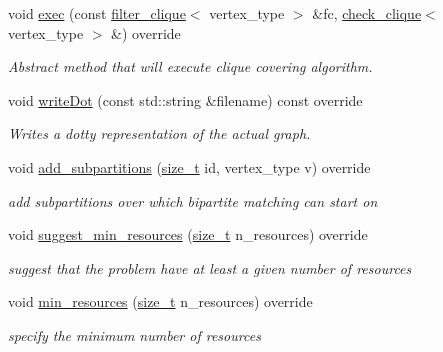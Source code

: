 \begin{DoxyCompactItemize}
\item 
void \hyperlink{classbipartite__matching__clique__covering_aa4caf6d3d3f37c7157f80c2e4d145a4e}{exec} (const \hyperlink{structfilter__clique}{filter\+\_\+clique}$<$ vertex\+\_\+type $>$ \&fc, \hyperlink{structcheck__clique}{check\+\_\+clique}$<$ vertex\+\_\+type $>$ \&) override
\begin{DoxyCompactList}\small\item\em Abstract method that will execute clique covering algorithm. \end{DoxyCompactList}\item 
void \hyperlink{classbipartite__matching__clique__covering_a50c738b6d8386f57f09314859a9e417b}{write\+Dot} (const std\+::string \&filename) const override
\begin{DoxyCompactList}\small\item\em Writes a dotty representation of the actual graph. \end{DoxyCompactList}\item 
void \hyperlink{classbipartite__matching__clique__covering_a25fd4df6e7216c827c3ff519350bef03}{add\+\_\+subpartitions} (\hyperlink{tutorial__fpt__2017_2intro_2sixth_2test_8c_a7c94ea6f8948649f8d181ae55911eeaf}{size\+\_\+t} id, vertex\+\_\+type v) override
\begin{DoxyCompactList}\small\item\em add subpartitions over which bipartite matching can start on \end{DoxyCompactList}\item 
void \hyperlink{classbipartite__matching__clique__covering_a9404da13a622a47c62cecc9c4c9556d8}{suggest\+\_\+min\+\_\+resources} (\hyperlink{tutorial__fpt__2017_2intro_2sixth_2test_8c_a7c94ea6f8948649f8d181ae55911eeaf}{size\+\_\+t} n\+\_\+resources) override
\begin{DoxyCompactList}\small\item\em suggest that the problem have at least a given number of resources \end{DoxyCompactList}\item 
void \hyperlink{classbipartite__matching__clique__covering_a6a23bb597b452b2a5ba8f7ca07673204}{min\+\_\+resources} (\hyperlink{tutorial__fpt__2017_2intro_2sixth_2test_8c_a7c94ea6f8948649f8d181ae55911eeaf}{size\+\_\+t} n\+\_\+resources) override
\begin{DoxyCompactList}\small\item\em specify the minimum number of resources \end{DoxyCompactList}\item 

\end{DoxyCompactItemize}
